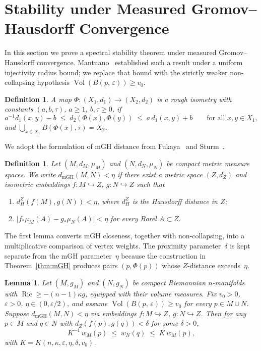 \documentclass[10pt,reqno]{amsart}
\newtheorem{lemma}[theorem]{Lemma}
\newtheorem{definition}[theorem]{Definition}
\theoremstyle{remark}
\newcommand{\Ric}{\operatorname{Ric}}
\newcommand{\Vol}{\operatorname{Vol}}
\newcommand{\B}[2]{B(#1,\,#2)}
\begin{document}
\section{Stability under Measured Gromov--Hausdorff Convergence}
\label{sec:applications}
In this section we prove a spectral stability theorem under measured
Gromov--Hausdorff convergence. Mantuano~\cite[Theorem~5.1]{Mantuano2005}
established such a result under a uniform injectivity radius bound;
we replace that bound with the strictly weaker non-collapsing
hypothesis $\Vol(\B{p}{\varepsilon})\geq v_0$.

\begin{definition}
\label{def:rough-isom}
A map $\Phi:(X_1,d_1)\to(X_2,d_2)$ is a \emph{rough isometry} with
constants $(a,b,\tau)$, $a\geq 1$, $b,\tau\geq 0$, if
\[
  a^{-1}d_1(x,y)-b \;\leq\; d_2(\Phi(x),\Phi(y))
  \;\leq\; a\,d_1(x,y)+b
  \qquad\text{for all }x,y\in X_1,
\]
and $\bigcup_{x\in X_1}B(\Phi(x),\tau)=X_2$.
\end{definition}

We adopt the formulation of mGH distance from
Fukaya~\cite{Fukaya1987} and Sturm~\cite{Sturm2006}.

\begin{definition}
\label{def:mGH}
Let $(M,d_M,\mu_M)$ and $(N,d_N,\mu_N)$ be compact metric measure
spaces. We write $d_{\mathrm{mGH}}(M,N)<\eta$ if there exist a metric
space $(Z,d_Z)$ and isometric embeddings $f:M\hookrightarrow Z$,
$g:N\hookrightarrow Z$ such that
\begin{enumerate}[label=(\roman*)]
\item $d_H^Z(f(M),g(N))<\eta$, where $d_H^Z$ is the Hausdorff
distance in $Z$;
\item\label{it:mGH-measure} $\bigl|f_*\mu_M(A)-g_*\mu_N(A)\bigr|<\eta$
for every Borel $A\subset Z$.
\end{enumerate}
\end{definition}

The first lemma converts mGH closeness, together with non-collapsing,
into a multiplicative comparison of vertex weights. The proximity
parameter~$\delta$ is kept separate from the mGH parameter~$\eta$
because the construction in Theorem~\ref{thm:mGH} produces pairs
$(p,\Phi(p))$ whose $Z$-distance exceeds~$\eta$.

\begin{lemma}
\label{lem:weight-comp}
Let $(M,g_M)$ and $(N,g_N)$ be compact Riemannian $n$-manifolds with
$\Ric\geq-(n-1)\kappa g$, equipped with their volume measures. Fix
$v_0>0$, $\varepsilon>0$, $\eta\in(0,\varepsilon/2)$, and assume
$\Vol(\B{p}{\varepsilon})\geq v_0$ for every $p\in M\cup N$. Suppose
$d_{\mathrm{mGH}}(M,N)<\eta$ via embeddings $f:M\hookrightarrow Z$,
$g:N\hookrightarrow Z$. Then for any $p\in M$ and $q\in N$ with
$d_Z(f(p),g(q))<\delta$ for some $\delta>0$,
\[
  K^{-1}\,w_M(p)\;\leq\; w_N(q)\;\leq\; K\,w_M(p),
\]
with $K=K(n,\kappa,\varepsilon,\eta,\delta,v_0)$.
\end{lemma}
\end{document}
